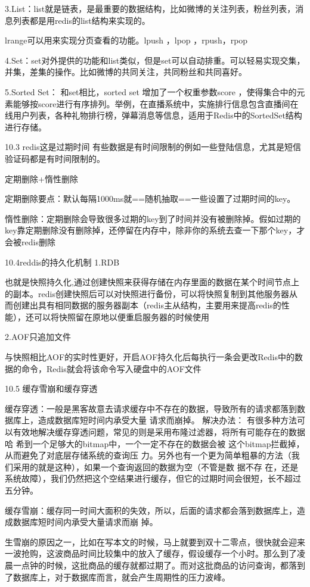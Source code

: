 \documentclass[UTF8]{ctexart}
\begin{document}
3.List：list就是链表，是最重要的数据结构，比如微博的关注列表，粉丝列表，消息列表都是用redis的list结构来实现的。

lrange可以用来实现分页查看的功能。lpush ，lpop ，rpush，rpop

4.Set：set对外提供的功能和list类似，但是set可以自动排重。可以轻易实现交集，并集，差集的操作。比如微博的共同关注，共同粉丝和共同喜好。

5.Sorted Set： 和set相比，sorted set 增加了一个权重参数score ，使得集合中的元素能够按score进行有序排列。举例，在直播系统中，实施排行信息包含直播间在线用户列表，各种礼物排行榜，弹幕消息等信息，适用于Redis中的SortedSet结构进行存储。

10.3 redis这是过期时间
有些数据是有时间限制的例如一些登陆信息，尤其是短信验证码都是有时间限制的。

定期删除+惰性删除

定期删除要点：默认每隔1000ms就==随机抽取==一些设置了过期时间的key。

惰性删除：定期删除会导致很多过期的key到了时间并没有被删除掉。假如过期的key靠定期删除没有删除掉，还停留在内存中，除非你的系统去查一下那个key，才会被redis删除

10.4reddis的持久化机制
1.RDB

也就是快照持久化,通过创建快照来获得存储在内存里面的数据在某个时间节点上的副本。redis创建快照后可以对快照进行备份，可以将快照复制到其他服务器从而创建出具有相同数据的服务器副本（redis主从结构，主要用来提高redis的性能），还可以将快照留在原地以便重启服务器的时候使用

2.AOF只追加文件

与快照相比AOF的实时性更好，开启AOF持久化后每执行一条会更改Redis中的数据的命令，Redis就会将该命令写入硬盘中的AOF文件

10.5 缓存雪崩和缓存穿透

缓存穿透：一般是黑客故意去请求缓存中不存在的数据，导致所有的请求都落到数据库上，造成数据库短时间内承受大量 请求而崩掉。
解决办法： 有很多种方法可以有效地解决缓存穿透问题，常见的则是采用布隆过滤器，将所有可能存在的数据哈 希到一个足够大的bitmap中，一个一定不存在的数据会被 这个bitmap拦截掉，从而避免了对底层存储系统的查询压 力。另外也有一个更为简单粗暴的方法（我们采用的就是这种），如果一个查询返回的数据为空（不管是数 据不存 在，还是系统故障），我们仍然把这个空结果进行缓存，但它的过期时间会很短，长不超过五分钟。

缓存雪崩：缓存同一时间大面积的失效，所以，后面的请求都会落到数据库上，造成数据库短时间内承受大量请求而崩 掉。

生雪崩的原因之一，比如在写本文的时候，马上就要到双十二零点，很快就会迎来一波抢购，这波商品时间比较集中的放入了缓存，假设缓存一个小时。那么到了凌晨一点钟的时候，这批商品的缓存就都过期了。而对这批商品的访问查询，都落到了数据库上，对于数据库而言，就会产生周期性的压力波峰。
\end{document}
